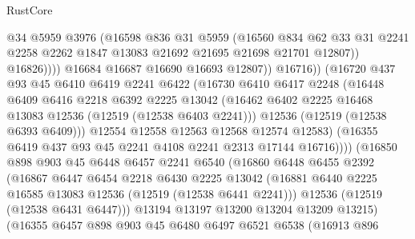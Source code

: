 \begin{lexlean}{RustCore}
\begin{coremodule}
                            @34
                            @5959
                            @3976
                            (@16598
                              @836
                              @31
                              @5959
                              (@16560
                                @834
                                @62
                                @33
                                @31
                                @2241
                                @2258
                                @2262
                                @1847
                                @13083
                                @21692
                                @21695
                                @21698
                                @21701
                                @12807))
                            @16826))))
                    @16684
                    @16687
                    @16690
                    @16693
                    @12807))
                @16716))
            (@16720
              @437
              @93
              @45
              @6410
              @6419
              @2241
              @6422
              (@16730
                @6410
                @6417
                @2248
                (@16448
                  @6409
                  @6416
                  @2218
                  @6392
                  @2225
                  @13042
                  (@16462 @6402 @2225 @16468 @13083 @12536 (@12519 (@12538 @6403 @2241)))
                  @12536
                  (@12519 (@12538 @6393 @6409)))
                @12554
                @12558
                @12563
                @12568
                @12574
                @12583)
              (@16355 @6419 @437 @93 @45 @2241 @4108 @2241 @2313 @17144 @16716))))
        (@16850
          @898
          @903
          @45
          @6448
          @6457
          @2241
          @6540
          (@16860
            @6448
            @6455
            @2392
            (@16867
              @6447
              @6454
              @2218
              @6430
              @2225
              @13042
              (@16881 @6440 @2225 @16585 @13083 @12536 (@12519 (@12538 @6441 @2241)))
              @12536
              (@12519 (@12538 @6431 @6447)))
            @13194
            @13197
            @13200
            @13204
            @13209
            @13215)
          (@16355
            @6457
            @898
            @903
            @45
            @6480
            @6497
            @6521
            @6538
            (@16913
              @896

\end{coremodule}
\end{lexlean}
